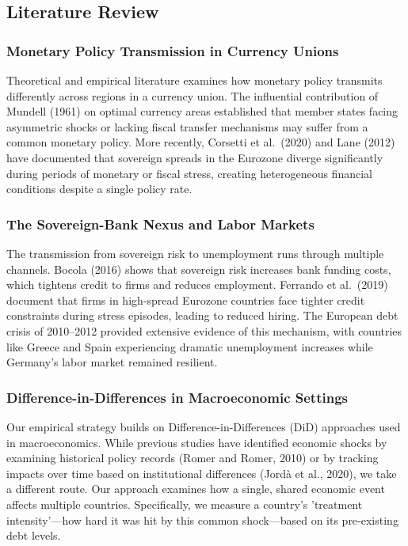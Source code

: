 \documentclass[12pt,a4paper]{article}
\begin{document}
\subsection{Literature Review}

\subsubsection{Monetary Policy Transmission in Currency Unions}

Theoretical and empirical literature examines how monetary policy transmits differently across regions in a currency union. The influential contribution of Mundell (1961) on optimal currency areas established that member states facing asymmetric shocks or lacking fiscal transfer mechanisms may suffer from a common monetary policy. More recently, Corsetti et al.\ (2020) and Lane (2012) have documented that sovereign spreads in the Eurozone diverge significantly during periods of monetary or fiscal stress, creating heterogeneous financial conditions despite a single policy rate.

\subsubsection{The Sovereign-Bank Nexus and Labor Markets}

The transmission from sovereign risk to unemployment runs through multiple channels. Bocola (2016) shows that sovereign risk increases bank funding costs, which tightens credit to firms and reduces employment. Ferrando et al.\ (2019) document that firms in high-spread Eurozone countries face tighter credit constraints during stress episodes, leading to reduced hiring. The European debt crisis of 2010--2012 provided extensive evidence of this mechanism, with countries like Greece and Spain experiencing dramatic unemployment increases while Germany's labor market remained resilient.

\subsubsection{Difference-in-Differences in Macroeconomic Settings}

Our empirical strategy builds on Difference-in-Differences (DiD) approaches used in macroeconomics. While previous studies have identified economic shocks by examining historical policy records (Romer and Romer, 2010) or by tracking impacts over time based on institutional differences (Jordà et al., 2020), we take a different route. Our approach examines how a single, shared economic event affects multiple countries. Specifically, we measure a country's 'treatment intensity'—how hard it was hit by this common shock—based on its pre-existing debt levels.
\end{document}
